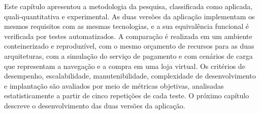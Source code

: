 Este capítulo apresentou a metodologia da pesquisa, classificada como aplicada,
quali-quantitativa e experimental. As duas versões da aplicação implementam os mesmos
requisitos com as mesmas tecnologias, e a sua equivalência funcional é verificada por testes
automatizados. A comparação é realizada em um ambiente conteinerizado e reproduzível, com o
mesmo orçamento de recursos para as duas arquiteturas, com a simulação do serviço de pagamento
e com cenários de carga que representam a navegação e a compra em uma loja virtual. Os
critérios de desempenho, escalabilidade, manutenibilidade, complexidade de desenvolvimento e
implantação são avaliados por meio de métricas objetivas, analisadas estatisticamente a partir
de cinco repetições de cada teste. O próximo capítulo descreve o desenvolvimento das duas
versões da aplicação.
